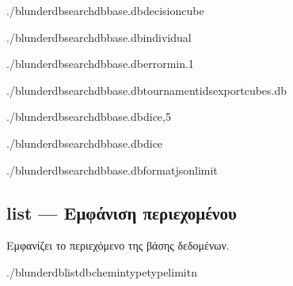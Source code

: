 \documentclass[letterpaper,10pt,greek]{sphinxmanual}
\begin{document}
\sphinxAtStartPar
{}

\begin{sphinxVerbatim}[commandchars=\\\{\}]
./blunderdbsearch\PYGZhy{}\PYGZhy{}dbbase.db\PYGZhy{}\PYGZhy{}decisioncube

./blunderdbsearch\PYGZhy{}\PYGZhy{}dbbase.db\PYGZhy{}\PYGZhy{}individual

./blunderdbsearch\PYGZhy{}\PYGZhy{}dbbase.db\PYGZhy{}\PYGZhy{}error\PYGZhy{}min.1

./blunderdbsearch\PYGZhy{}\PYGZhy{}dbbase.db\PYGZhy{}\PYGZhy{}tournament\PYGZhy{}ids\PYGZhy{}\PYGZhy{}exportcubes.db

./blunderdbsearch\PYGZhy{}\PYGZhy{}dbbase.db\PYGZhy{}\PYGZhy{}dice,5

./blunderdbsearch\PYGZhy{}\PYGZhy{}dbbase.db\PYGZhy{}\PYGZhy{}dice

./blunderdbsearch\PYGZhy{}\PYGZhy{}dbbase.db\PYGZhy{}\PYGZhy{}formatjson\PYGZhy{}\PYGZhy{}limit
\end{sphinxVerbatim}


\subsection{list — Εμφάνιση περιεχομένου}
\label{\detokenize{cli:list-lister-le-contenu}}
\sphinxAtStartPar
Εμφανίζει το περιεχόμενο της βάσης δεδομένων.

\begin{sphinxVerbatim}[commandchars=\\\{\}]
./blunderdblist\PYGZhy{}\PYGZhy{}db\PYGZlt{}chemin\PYGZgt{}\PYGZhy{}\PYGZhy{}type\PYGZlt{}type\PYGZgt{}\PYG{o}{[}\PYGZhy{}\PYGZhy{}limit\PYGZlt{}n\PYGZgt{}\PYG{o}{]}
\end{sphinxVerbatim}
\end{document}
